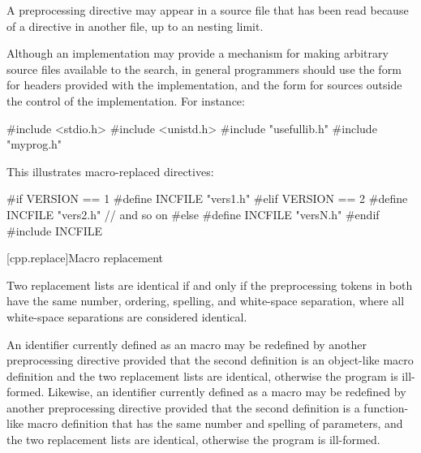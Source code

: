 \pnum
A
preprocessing directive may appear
in a source file that has been read because of a
directive in another file,
up to an  nesting limit.

\pnum
\enternote
Although an implementation may provide a mechanism for making arbitrary
source files available to the \tcode{< >} search, in general
programmers should use the \tcode{< >} form for headers provided
with the implementation, and the  form for sources
outside the control of the implementation. For instance:

\begin{codeblock}
#include <stdio.h>
#include <unistd.h>
#include "usefullib.h"
#include "myprog.h"
\end{codeblock}

\exitnote

\pnum
\enterexample
This illustrates macro-replaced
directives:

\begin{codeblock}
#if VERSION == 1
    #define INCFILE  "vers1.h"
#elif VERSION == 2
    #define INCFILE  "vers2.h"   // and so on
#else
    #define INCFILE  "versN.h"
#endif
#include INCFILE
\end{codeblock}
\exitexample

[cpp.replace]{Macro replacement}%
%
%

\pnum
{}%
Two replacement lists are identical if and only if
the preprocessing tokens in both have
the same number, ordering, spelling, and white-space separation,
where all white-space separations are considered identical.

\pnum
An identifier currently defined as an
%
%
macro may be redefined by another
preprocessing directive provided that the second definition is an
object-like macro definition and the two replacement lists
are identical, otherwise the program is ill-formed.
Likewise, an identifier currently defined as
a
%
%
macro may be redefined by another
preprocessing directive provided that the second definition is a
function-like macro definition that has the same number and spelling
of parameters,
and the two replacement lists are identical,
otherwise the program is ill-formed.

